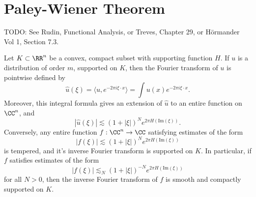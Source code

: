 \section{Paley-Wiener Theorem}

TODO: See Rudin, Functional Analysis, or Treves, Chapter 29, or H\"{o}rmander Vol 1, Section 7.3.

\begin{theorem}
    Let $K \subset \RR^n$ be a convex, compact subset with supporting function $H$. If $u$ is a distribution of order $m$, supported on $K$, then the Fourier transform of $u$ is pointwise defined by
    \[ \widehat{u}(\xi) = \langle u, e^{- 2 \pi i \xi \cdot x} \rangle = \int u(x) e^{-2 \pi i \xi \cdot x}. \]
    Moreover, this integral formula gives an extension of $\widehat{u}$ to an entire function on $\CC^n$, and
    \[ |\widehat{u}(\xi)| \lesssim (1 + |\xi|)^N e^{2 \pi H(\text{Im}(\xi))}. \]
    Conversely, any entire function $f: \CC^n \to \CC$ satisfying estimates of the form
    \[ |f(\xi)| \lesssim (1 + |\xi|)^N e^{2 \pi H(\text{Im}(\xi))} \]
    is tempered, and it's inverse Fourier transform is supported on $K$. In particular, if $f$ satisfies estimates of the form
    \[ |f(\xi)| \lesssim_N (1 + |\xi|)^{-N} e^{2 \pi H(\text{Im}(\xi))} \]
    for all $N > 0$, then the inverse Fourier transform of $f$ is smooth and compactly supported on $K$.
\end{theorem}
